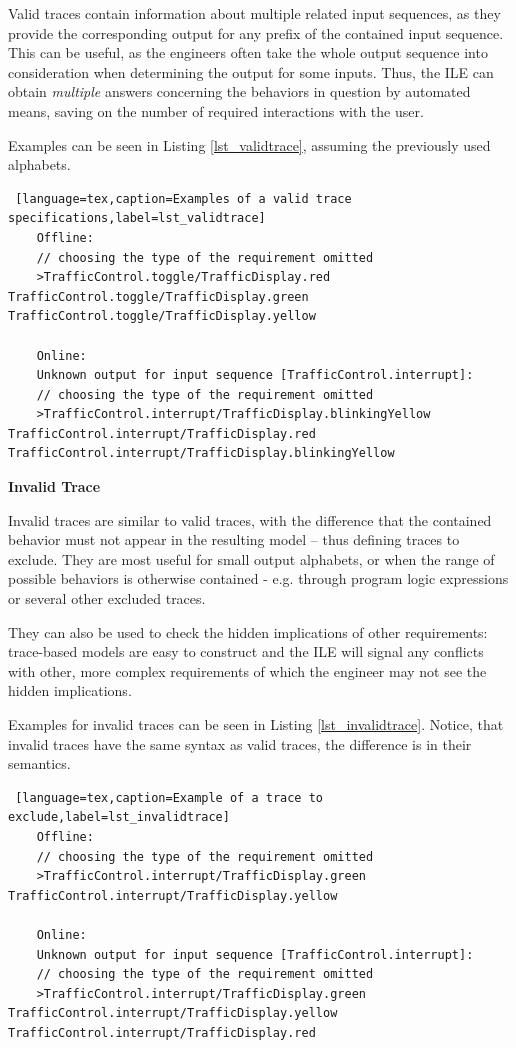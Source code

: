 Valid traces contain information about multiple related input sequences, as they provide the corresponding output for any prefix of the contained input sequence. This can be useful, as the engineers often take the whole output sequence into consideration when determining the output for some inputs. Thus, the ILE can obtain \textit{multiple} answers concerning the behaviors in question by automated means, saving on the number of required interactions with the user.

Examples can be seen in Listing \ref{lst_validtrace}, assuming the previously used alphabets.

\bigskip
\begin{lstlisting} [language=tex,caption=Examples of a valid trace specifications,label=lst_validtrace]
	Offline:
	// choosing the type of the requirement omitted
	>TrafficControl.toggle/TrafficDisplay.red TrafficControl.toggle/TrafficDisplay.green TrafficControl.toggle/TrafficDisplay.yellow
	
	Online: 
	Unknown output for input sequence [TrafficControl.interrupt]:
	// choosing the type of the requirement omitted
	>TrafficControl.interrupt/TrafficDisplay.blinkingYellow TrafficControl.interrupt/TrafficDisplay.red TrafficControl.interrupt/TrafficDisplay.blinkingYellow
\end{lstlisting}

\textbf{Invalid Trace}

Invalid traces are similar to valid traces, with the difference that the contained behavior must not appear in the resulting model -- thus defining traces to exclude. They are most useful for small output alphabets, or when the range of possible behaviors is otherwise contained - e.g. through program logic expressions or several other excluded traces.

They can also be used to check the hidden implications of other requirements: trace-based models are easy to construct and the ILE will signal any conflicts with other, more complex requirements of which the engineer may not see the hidden implications.

Examples for invalid traces can be seen in Listing \ref{lst_invalidtrace}. Notice, that invalid traces have the same syntax as valid traces, the difference is in their semantics.

\bigskip
\begin{lstlisting} [language=tex,caption=Example of a trace to exclude,label=lst_invalidtrace]
	Offline:
	// choosing the type of the requirement omitted
	>TrafficControl.interrupt/TrafficDisplay.green TrafficControl.interrupt/TrafficDisplay.yellow
	
	Online:
	Unknown output for input sequence [TrafficControl.interrupt]:
	// choosing the type of the requirement omitted
	>TrafficControl.interrupt/TrafficDisplay.green TrafficControl.interrupt/TrafficDisplay.yellow TrafficControl.interrupt/TrafficDisplay.red
\end{lstlisting}

